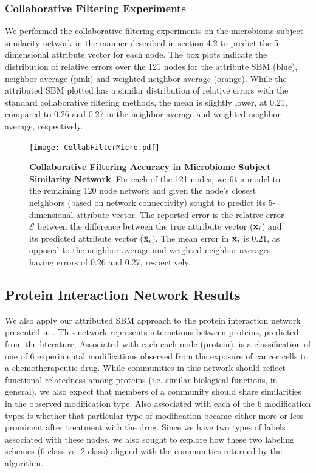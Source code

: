 \subsubsection{Collaborative Filtering Experiments}
We performed the collaborative filtering experiments on the microbiome subject similarity network in the manner described in section 4.2 to predict the 5-dimensional attribute vector for each node. The box plots indicate the distribution of relative errors over the 121 nodes for the attribute SBM (blue), neighbor average (pink) and weighted neighbor average (orange). While the attributed SBM plotted has a similar distribution of relative errors with the standard collaborative filtering methods, the mean is slightly lower, at 0.21, compared to 0.26 and 0.27 in the neighbor average and weighted neighbor average, respectively.
\begin{figure}[h!]
\begin{center}
\texttt{[image: CollabFilterMicro.pdf]}
\caption{{\bf Collaborative Filtering Accuracy in Microbiome Subject Similarity Network}: For each of the 121 nodes, we fit a model to the remaining 120 node network and given the node's closest  neighbors (based on network connectivity) sought to predict its 5-dimensional attribute vector. The reported error is the relative error $\mathcal{E}$ between the difference between the true attribute vector (${\bf x}_{i}$) and its predicted attribute vector (${\hat{\bf x}}_{i}$). The mean error in ${\bf x}_{i}$ is 0.21, as opposed to the neighbor average and weighted neighbor averages, having errors of 0.26 and 0.27, respectively. }
\end{center}
\end{figure}

\subsection{Protein Interaction Network Results}
We also apply our attributed SBM approach to the protein interaction network presented in \cite{bonacci}. This network represents interactions between proteins, predicted from the literature. Associated with each each node (protein), is a classification of one of 6 experimental modifications observed from the exposure of cancer cells to a chemotherapeutic drug. While communities in this network should reflect functional relatedness among proteins (i.e. similar biological functions, in general), we also expect that members of a community should share similarities in the observed modification type. Also associated with each of the 6 modification types is whether that particular type of modification became either more or less prominent after treatment with the drug. Since we have two types of labels associated with these nodes, we also sought to explore how these two labeling schemes (6 class vs. 2 class) aligned with the communities returned by the algorithm. 

